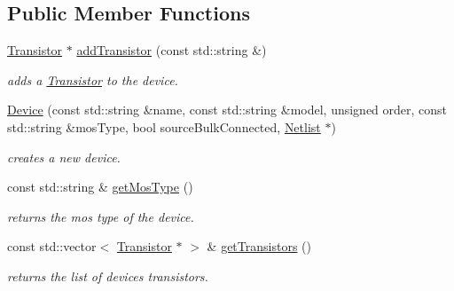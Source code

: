\subsection*{Public Member Functions}
\begin{DoxyCompactItemize}
\item 
\mbox{\hyperlink{class_open_chams_1_1_transistor}{Transistor}} $\ast$ \mbox{\hyperlink{class_open_chams_1_1_device_ad45d34f8765dd113a5b12289efe66c07}{add\+Transistor}} (const std\+::string \&)
\begin{DoxyCompactList}\small\item\em adds a \mbox{\hyperlink{class_open_chams_1_1_transistor}{Transistor}} to the device. \end{DoxyCompactList}\item 
\mbox{\hyperlink{class_open_chams_1_1_device_af5d1871d38a605955d7848d07df6d9a4}{Device}} (const std\+::string \&name, const std\+::string \&model, unsigned order, const std\+::string \&mos\+Type, bool source\+Bulk\+Connected, \mbox{\hyperlink{class_open_chams_1_1_netlist}{Netlist}} $\ast$)
\begin{DoxyCompactList}\small\item\em creates a new device. \end{DoxyCompactList}\item 
\mbox{\label{class_open_chams_1_1_device_a831ce553c23908f447a5be332ecd5946}} 
const std\+::string \& \mbox{\hyperlink{class_open_chams_1_1_device_a831ce553c23908f447a5be332ecd5946}{get\+Mos\+Type}} ()
\begin{DoxyCompactList}\small\item\em returns the mos type of the device. \end{DoxyCompactList}\item 
\mbox{\label{class_open_chams_1_1_device_a4033525cab6387eb057f71f5feed9802}} 
const std\+::vector$<$ \mbox{\hyperlink{class_open_chams_1_1_transistor}{Transistor}} $\ast$ $>$ \& \mbox{\hyperlink{class_open_chams_1_1_device_a4033525cab6387eb057f71f5feed9802}{get\+Transistors}} ()
\begin{DoxyCompactList}\small\item\em returns the list of device\textquotesingle{}s transistors. \end{DoxyCompactList}\item 
\mbox{\label{class_open_chams_1_1_device_aa9d93f306256ac57b8bb8a4cb436c8d3}} 

\end{DoxyCompactItemize}
